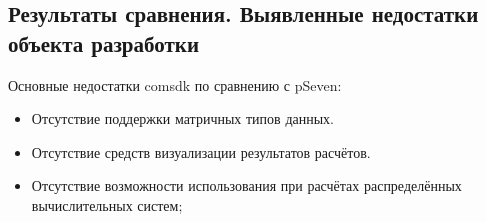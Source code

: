\subsection{Результаты сравнения. Выявленные недостатки объекта разработки}
\begin{frame}
    Основные недостатки comsdk по сравнению с pSeven:
    \begin{itemize}
        \item Отсутствие поддержки матричных типов данных.
        \item Отсутствие средств визуализации результатов расчётов.
        \item Отсутствие возможности использования при расчётах распределённых вычислительных систем;
    \end{itemize}
\end{frame}
